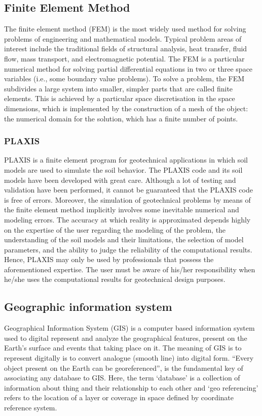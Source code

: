 \subsection{Finite Element Method}
The finite element method (FEM) is the most widely used method for solving problems of engineering and mathematical models. Typical problem areas of interest include the traditional fields of structural analysis, heat transfer, fluid flow, mass transport, and electromagnetic potential. The FEM is a particular numerical method for solving partial differential equations in two or three space variables (i.e., some boundary value problems). To solve a problem, the FEM subdivides a large system into smaller, simpler parts that are called finite elements. This is achieved by a particular space discretisation in the space dimensions, which is implemented by the construction of a mesh of the object: the numerical domain for the solution, which has a finite number of points. 
\subsubsection{PLAXIS}
PLAXIS is a finite element program for geotechnical applications in which soil models are used to simulate the soil behavior. The PLAXIS code and its soil models have been developed with great care. Although a lot of testing and validation have been performed, it cannot be guaranteed that the PLAXIS code is free of errors. Moreover, the simulation of geotechnical problems by means of the finite element method implicitly involves some inevitable numerical and modeling errors. The accuracy at which reality is approximated depends highly on the expertise of the user regarding the modeling of the problem, the understanding of the soil models and their limitations, the selection of model parameters, and the ability to judge the reliability of the computational results. Hence, PLAXIS may only be used by professionals that possess the aforementioned expertise. The user must be aware of his/her responsibility when he/she uses the computational results for geotechnical design purposes.

\subsection{Geographic information system}
Geographical Information System (GIS) is a computer based information system used to digital represent and analyze the geographical features, present on the Earth’s surface and events that taking place on it. The meaning of GIS is to represent digitally is to convert analogue (smooth line) into digital form.
“Every object present on the Earth can be geo\-referenced”, is the fundamental key of associating any database to GIS. Here, the term ‘database’ is a collection of information about thing and their relationship to each other and ‘geo referencing’ refers to the location of a layer or coverage in space defined by co\-ordinate reference system.

